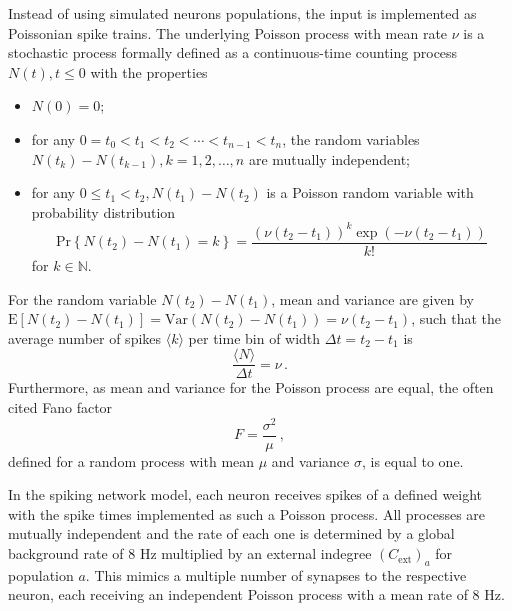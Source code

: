 Instead of using simulated neurons populations, the input is implemented as Poissonian 
spike trains. The underlying Poisson process with mean rate $\nu$ is a stochastic process formally 
defined as a continuous-time counting process ${N(t), t \le 0}$ with the properties%
~\cite{tuckwell2005introduction}
\begin{itemize}
    \item $N(0) = 0$;
    \item for any $0 = t_0 < t_1 < t_2 < \cdots < t_{n-1} < t_n$, the random variables
        $N(t_k) - N(t_{k-1}), k = 1, 2, \dots, n$ are mutually independent; 
    \item for any $0 \le t_1 < t_2, N(t_1) - N(t_2)$ is a Poisson random variable with 
        probability distribution 
        \begin{equation}
            \text{Pr}\left\{N(t_2) - N(t_1) = k \right\} 
                = \frac{\left( \nu(t_2 - t_1) \right)^k \exp \left( - \nu(t_2 - t_1) \right) }{k!}
            \label{eq:poisson_process}
        \end{equation}
        for $k \in \mathbb{N}$.
\end{itemize}
For the random variable $N(t_2) - N(t_1)$, mean and variance are given by
$\text{E}[N(t_2) - N(t_1)] = \text{Var}(N(t_2) - N(t_1)) = \nu(t_2 - t_1)$,
such that the average number of spikes $\langle k \rangle$ 
per time bin of width $\Delta t = t_2 - t_1$ is 
\begin{equation}
    \frac{\langle{N}\rangle}{\Delta t} = \nu \,.
    \label{eq:poisson_rate}
\end{equation}
Furthermore, as mean and variance for the Poisson process are equal, the often cited 
Fano factor
\begin{equation}
    F = \frac{\sigma^2}{\mu}\,,
    \label{eq:Fano}
\end{equation}
defined for a random process with mean $\mu$ and variance $\sigma$, 
is equal to one. 

In the spiking network model, each neuron receives spikes of a defined weight with 
the spike times implemented as such a Poisson process. All processes are mutually independent 
and the rate of each one is determined by a global 
background rate of $8$ Hz multiplied by an external indegree $(C_\text{ext})_a$ for
population $a$. 
This mimics a multiple number of synapses to the respective neuron, each receiving an 
independent Poisson process with a mean rate of $8$ Hz. 

